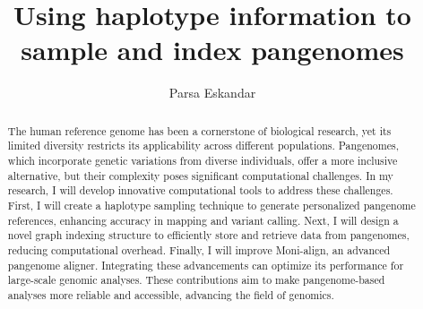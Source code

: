 \documentclass[11pt]{ucthesis}
\begin{document}

\title{Using haplotype information to sample and index pangenomes}
\author{Parsa Eskandar}

\begin{frontmatter}

\maketitle
\copyrightpage

\tableofcontents
\listoffigures

\begin{abstract}
The human reference genome has been a cornerstone of biological research, yet its limited diversity restricts its applicability across different populations. Pangenomes, which incorporate genetic variations from diverse individuals, offer a more inclusive alternative, but their complexity poses significant computational challenges. In my research, I will develop innovative computational tools to address these challenges. First, I will create a haplotype sampling technique to generate personalized pangenome references, enhancing accuracy in mapping and variant calling. Next, I will design a novel graph indexing structure to efficiently store and retrieve data from pangenomes, reducing computational overhead. Finally, I will improve Moni-align, an advanced pangenome aligner. Integrating these advancements can optimize its performance for large-scale genomic analyses. These contributions aim to make pangenome-based analyses more reliable and accessible, advancing the field of genomics.

\end{abstract}




\end{frontmatter}
\end{document}
